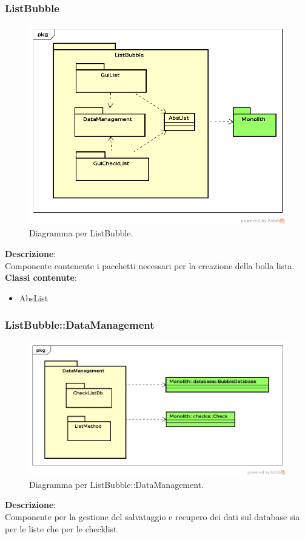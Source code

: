 \clearpage

\subsubsection{ListBubble}
   \FloatBarrier
   \begin{figure}[ht]
   \centering
\includegraphics[width=\textwidth,keepaspectratio]{img/ListGeneral}
   \caption{Diagramma per ListBubble.}
\end{figure}
\FloatBarrier
\textbf{Descrizione}:\\
 Componente contenente i pacchetti necessari per la creazione della bolla lista. 
\\ \textbf{Classi contenute}:\\
\begin{itemize}
\item AbsList
\end{itemize}


\clearpage

\subsubsection{ListBubble::DataManagement}
   \FloatBarrier
   \begin{figure}[ht]
   \centering
\includegraphics[width=\textwidth,keepaspectratio]{img/ListDataManagement}
   \caption{Diagramma per ListBubble::DataManagement.}
\end{figure}
\FloatBarrier
\textbf{Descrizione}:\\
 Componente per la gestione del salvataggio e recupero dei dati sul database sia per le liste che per le checklist 


